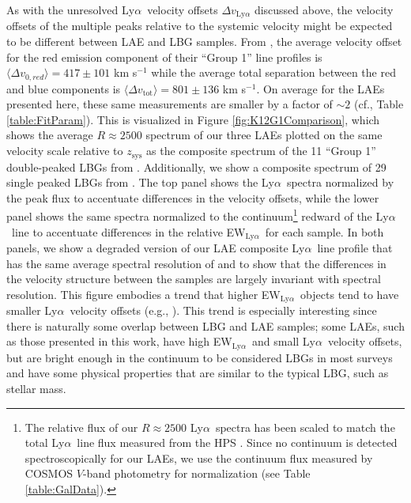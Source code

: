 \documentclass{emulateapj}
\newcommand{\lya}{Ly$\alpha$}
\def\z{z}
\def\ewlya{EW$_{\mathrm{Ly}\alpha}$}
\begin{document}
As with the unresolved \lya\ velocity offsets $\Delta v_{\mathrm{Ly}\alpha}$ discussed above, the velocity offsets of the multiple peaks relative to the systemic velocity might be expected to be different between LAE and LBG samples. From \citet{kulas2012}, the average velocity offset for the red emission component of their ``Group 1'' line profiles is $\langle\Delta v_{0,red}\rangle = 417\pm101$ km s$^{-1}$ while the average total separation between the red and blue components is $\langle\Delta v_{\mathrm{tot}}\rangle = 801\pm136$ km s$^{-1}$. On average for the LAEs presented here, these same measurements are smaller by a factor of $\sim2$ (cf., Table \ref{table:FitParam}). This is visualized in Figure \ref{fig:K12G1Comparison}, which shows the average $R\approx2500$ spectrum of our three LAEs plotted on the same velocity scale relative to $\z_{\mathrm{sys}}$ as the composite spectrum of the 11 ``Group 1'' double-peaked LBGs from \citet{kulas2012}. Additionally, we show a composite spectrum of 29 single peaked LBGs from \citet{steidel2010}. The top panel shows the \lya\ spectra normalized by the peak flux to accentuate differences in the velocity offsets, while the lower panel shows the same spectra normalized to the continuum\footnote[13]{The relative flux of our $R\approx2500$ \lya\ spectra has been scaled to match the total \lya\ line flux measured from the HPS \citep{adams2011}. Since no continuum is detected spectroscopically for our LAEs, we use the continuum flux measured by COSMOS $V$-band photometry for normalization (see Table \ref{table:GalData}).} redward of the \lya\ line to accentuate differences in the relative \ewlya\ for each sample. In both panels, we show a degraded version of our LAE composite \lya\ line profile that has the same average spectral resolution of \citet{steidel2010} and \citet{kulas2012} to show that the differences in the velocity structure between the samples are largely invariant with spectral resolution. This figure embodies a trend that higher \ewlya\ objects tend to have smaller \lya\ velocity offsets (e.g., \citealp{hashimoto2012}). This trend is especially interesting since there is naturally some overlap between LBG and LAE samples; some LAEs, such as those presented in this work, have high \ewlya\ and small \lya\ velocity offsets, but are bright enough in the continuum to be considered LBGs in most surveys and have some physical properties that are similar to the typical LBG, such as stellar mass.
\end{document}
